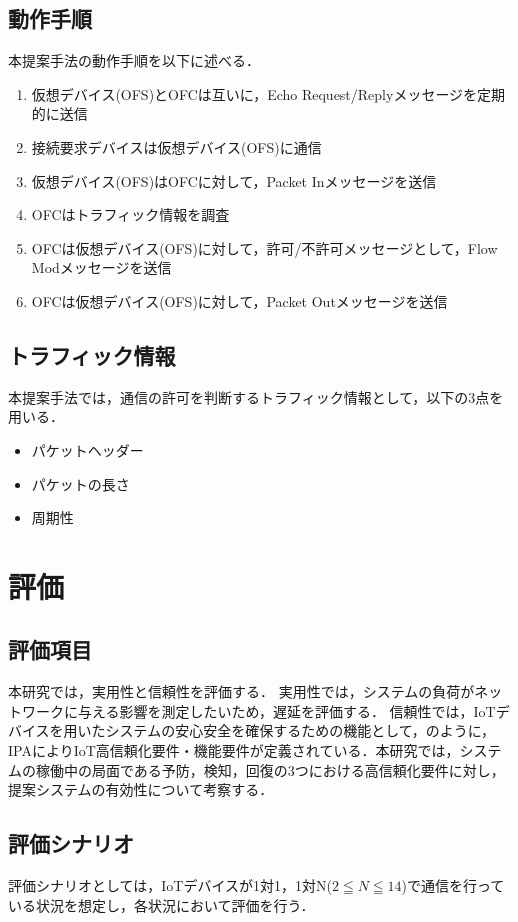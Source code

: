 \documentclass[a4paper,10pt,twocolumn,uplatex]{jsarticle}
\begin{document}
\subsection{動作手順}
本提案手法の動作手順を以下に述べる．

\begin{enumerate}
  \item 仮想デバイス(OFS)とOFCは互いに，Echo Request/Replyメッセージを定期的に送信
  \item 接続要求デバイスは仮想デバイス(OFS)に通信
  \item 仮想デバイス(OFS)はOFCに対して，Packet Inメッセージを送信
  \item OFCはトラフィック情報を調査
  \item OFCは仮想デバイス(OFS)に対して，許可/不許可メッセージとして，Flow Modメッセージを送信
  \item OFCは仮想デバイス(OFS)に対して，Packet Outメッセージを送信
\end{enumerate}

\subsection{トラフィック情報}
本提案手法では，通信の許可を判断するトラフィック情報として，以下の3点を用いる．

\begin{itemize}
  \item パケットヘッダー
  \item パケットの長さ
  \item 周期性
\end{itemize}

\section{評価}
\subsection{評価項目}
本研究では，実用性と信頼性を評価する．
実用性では，システムの負荷がネットワークに与える影響を測定したいため，遅延を評価する．
信頼性では，IoTデバイスを用いたシステムの安心安全を確保するための機能として，のように，IPAによりIoT高信頼化要件・機能要件が定義されている．本研究では，システムの稼働中の局面である予防，検知，回復の3つにおける高信頼化要件に対し，提案システムの有効性について考察する．


\subsection{評価シナリオ}
評価シナリオとしては，IoTデバイスが1対1，1対N($2\leqq N \leqq 14$)で通信を行っている状況を想定し，各状況において評価を行う．
\end{document}
